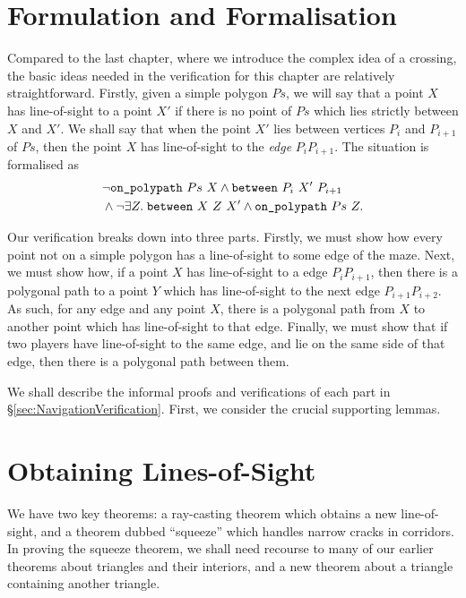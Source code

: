 \section{Formulation and Formalisation}\label{sec:Jordan2Formulation}
Compared to the last chapter, where we introduce the complex idea of a crossing, the basic ideas needed in the verification for this chapter are relatively straightforward. Firstly, given a simple polygon $Ps$, we will say that a point $X$ has line-of-sight to a point $X'$ if there is no point of $Ps$ which lies strictly between $X$ and $X'$. We shall say that when the point $X'$ lies between vertices $P_i$ and $P_{i+1}$ of $Ps$, then the point $X$ has line-of-sight to the \emph{edge} $P_iP_{i+1}$. The situation is formalised as
\begin{displaymath}
  \begin{aligned}
    &\neg\texttt{on\_polypath}\ Ps\ X \wedge \texttt{between}\ P_i\ X'\ P_{i+1}\\
    &\wedge \neg\exists Z.\; \texttt{between}\ X\ Z\ X' \wedge \texttt{on\_polypath}\ Ps\ Z.
  \end{aligned}
\end{displaymath}

Our verification breaks down into three parts. Firstly, we must show how every point not on a simple polygon has a line-of-sight to some edge of the maze. Next, we must show how, if a point $X$ has line-of-sight to a edge $P_iP_{i+1}$, then there is a polygonal path to a point $Y$ which has line-of-sight to the next edge $P_{i+1}P_{i+2}$. As such, for any edge and any point $X$, there is a polygonal path from $X$ to another point which has line-of-sight to that edge. Finally, we must show that if two players have line-of-sight to the same edge, and lie on the same side of that edge, then there is a polygonal path between them.

We shall describe the informal proofs and verifications of each part in \S\ref{sec:NavigationVerification}. First, we consider the crucial supporting lemmas.

\section{Obtaining Lines-of-Sight}\label{sec:Jordan2Lemmas}
We have two key theorems: a ray-casting theorem which obtains a new line-of-sight, and a theorem dubbed ``squeeze'' which handles narrow cracks in corridors. In proving the squeeze theorem, we shall need recourse to many of our earlier theorems about triangles and their interiors, and a new theorem about a triangle containing another triangle.

